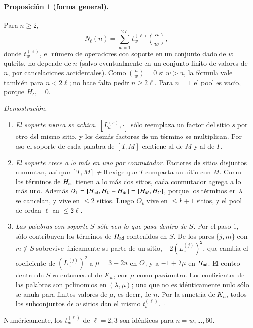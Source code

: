\documentclass[11pt,a4paper]{article}
\begin{document}
\paragraph{Proposición 1 (forma general).} Para $n\geq2$,
\begin{equation}
  N_\ell(n)=\sum_{w=1}^{2\ell}t^{(\ell)}_w\binom nw ,
  \label{eq:nlgeneral}
\end{equation}
donde $t^{(\ell)}_w$, el número de operadores con soporte en un conjunto dado de $w$ qutrits, no
depende de $n$ (salvo eventualmente en un conjunto finito de valores de $n$, por cancelaciones
accidentales). Como $\binom nw=0$ si $w>n$, la fórmula vale también para $n<2\ell$; no hace falta
pedir $n\geq2\ell$. Para $n=1$ el pool es vacío, porque $H_C=0$.

\emph{Demostración.}
\begin{enumerate}
\item \emph{El soporte nunca se achica.} $[L_a^{(s)},\cdot]$ sólo reemplaza un factor del sitio $s$
  por otro del mismo sitio, y los demás factores de un término se multiplican. Por eso el soporte de
  cada palabra de $[T,M]$ contiene al de $M$ y al de $T$.
\item \emph{El soporte crece a lo más en uno por conmutador.} Factores de sitios disjuntos conmutan,
  así que $[T,M]\neq0$ exige que $T$ comparta un sitio con $M$. Como los términos de $H_{\rm ad}$
  tienen a lo más dos sitios, cada conmutador agrega a lo más uno. Además
  $O_1=[H_{\rm ad},H_C-H_M]=[H_M,H_C]$, porque los términos en $\lambda$ se cancelan, y vive en
  $\leq2$ sitios. Luego $O_k$ vive en $\leq k+1$ sitios, y el pool de orden $\ell$ en $\leq2\ell$.
\item \emph{Las palabras con soporte $S$ sólo ven lo que pasa dentro de $S$.} Por el paso 1, sólo
  contribuyen los términos de $H_{\rm ad}$ contenidos en $S$. De los pares $\{j,m\}$ con $m\notin S$
  sobrevive únicamente su parte de un sitio, $-2(L_z^{(j)})^2$, que cambia el coeficiente de
  $(L_z^{(j)})^2$ a $\mu=3-2n$ en $O_0$ y a $-1+\lambda\mu$ en $H_{\rm ad}$. El conteo dentro de $S$ es
  entonces el de $K_w$, con $\mu$ como parámetro. Los coeficientes de las palabras son polinomios en
  $(\lambda,\mu)$; uno que no es idénticamente nulo sólo se anula para finitos valores de $\mu$, es
  decir, de $n$. Por la simetría de $K_n$, todos los subconjuntos de $w$ sitios dan el mismo
  $t^{(\ell)}_w$. \hfill$\square$
\end{enumerate}
Numéricamente, los $t^{(\ell)}_w$ de $\ell=2,3$ son idénticos para $n=w,\dots,60$.
\end{document}
